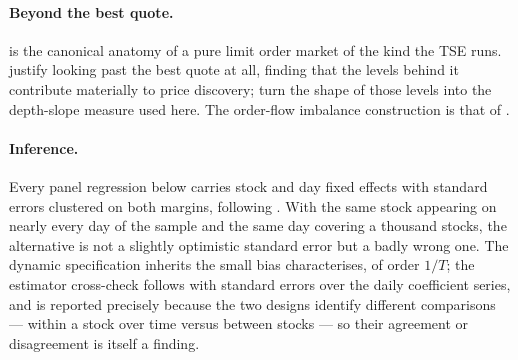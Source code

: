 \paragraph{Beyond the best quote.}
\textcite{BiaisHillionSpatt1995} is the canonical anatomy of a pure limit order
market of the kind the TSE runs. \textcite{CaoHanschWang2009} justify looking
past the best quote at all, finding that the levels behind it contribute
materially to price discovery; \textcite{NaesSkjeltorp2006} turn the shape of
those levels into the depth-slope measure used here. The order-flow imbalance
construction is that of \textcite{ContKukanovStoikov2014}.

\paragraph{Inference.}
Every panel regression below carries stock and day fixed effects with standard
errors clustered on both margins, following \textcite{CameronGelbachMiller2011}.
With the same stock appearing on nearly every day of the sample and the same
day covering a thousand stocks, the alternative is not a slightly optimistic
standard error but a badly wrong one. The dynamic specification inherits the
small bias \textcite{Nickell1981} characterises, of order $1/T$; the estimator
cross-check follows \textcite{FamaMacBeth1973} with \textcite{NeweyWest1987}
standard errors over the daily coefficient series, and is reported precisely
because the two designs identify different comparisons --- within a stock over
time versus between stocks --- so their agreement or disagreement is itself a
finding.
